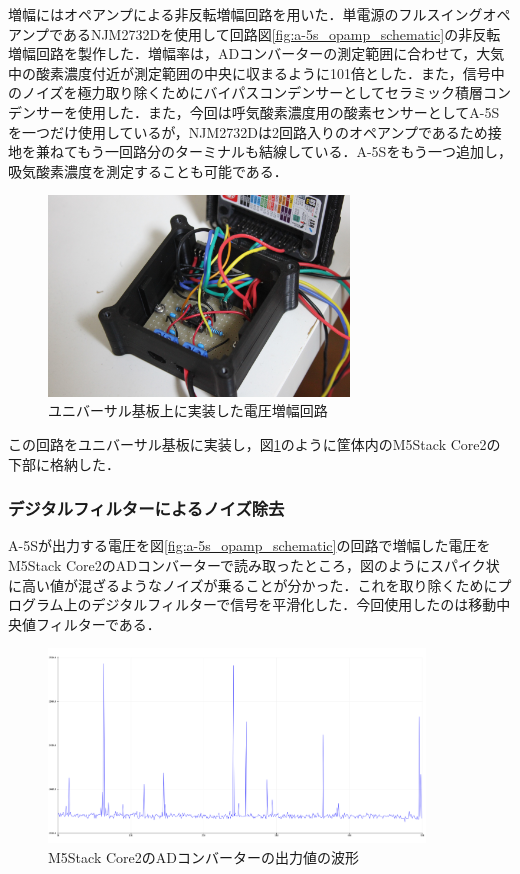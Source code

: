 増幅にはオペアンプによる非反転増幅回路を用いた．単電源のフルスイングオペアンプであるNJM2732Dを使用して回路図\ref{fig:a-5s_opamp_schematic}の非反転増幅回路を製作した．増幅率は，ADコンバーターの測定範囲に合わせて，大気中の酸素濃度付近が測定範囲の中央に収まるように101倍とした．また，信号中のノイズを極力取り除くためにバイパスコンデンサーとしてセラミック積層コンデンサーを使用した．また，今回は呼気酸素濃度用の酸素センサーとしてA-5Sを一つだけ使用しているが，NJM2732Dは2回路入りのオペアンプであるため接地を兼ねてもう一回路分のターミナルも結線している．A-5Sをもう一つ追加し，吸気酸素濃度を測定することも可能である．

\begin{figure}[H]
  \begin{center}
    \includegraphics[width=8cm]{fig/opamp_universal}
    \caption{ユニバーサル基板上に実装した電圧増幅回路}
    \label{fig:opamp_universal}
  \end{center}
\end{figure}

この回路をユニバーサル基板に実装し，図\ref{fig:opamp_universal}のように筐体内のM5Stack Core2の下部に格納した．

\subsubsection{デジタルフィルターによるノイズ除去}

A-5Sが出力する電圧を図\ref{fig:a-5s_opamp_schematic}の回路で増幅した電圧をM5Stack Core2のADコンバーターで読み取ったところ，図のようにスパイク状に高い値が混ざるようなノイズが乗ることが分かった．これを取り除くためにプログラム上のデジタルフィルターで信号を平滑化した．今回使用したのは移動中央値フィルターである．

\begin{figure}[H]
  \begin{center}
    \includegraphics[width=10cm]{fig/m5core2_adc_raw}
    \caption{M5Stack Core2のADコンバーターの出力値の波形}
    \label{fig:m5core2_adc_raw}
  \end{center}
\end{figure}

